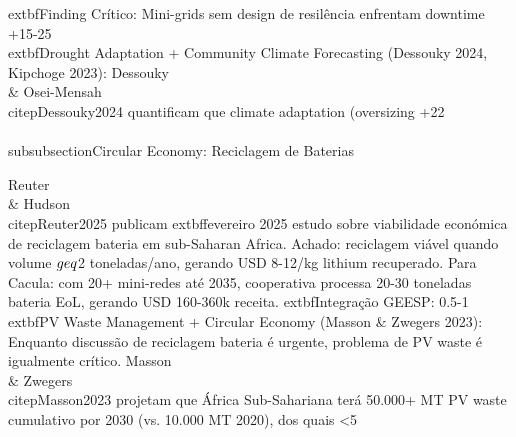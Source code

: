 \documentclass[12pt, a4paper]{article}
\begin{document}
{{{{{{{{{{{	extbf{Finding Crítico}: Mini-grids sem design de resilência enfrentam downtime +15-25\\%

	extbf{Drought Adaptation + Community Climate Forecasting (Dessouky 2024, Kipchoge 2023)}: Dessouky \\& Osei-Mensah~\\citep{Dessouky2024} quantificam que climate adaptation (oversizing +22\\%

\\subsubsection{Circular Economy: Reciclagem de Baterias}

Reuter \\& Hudson~\\citep{Reuter2025} publicam 	extbf{fevereiro 2025} estudo sobre viabilidade económica de reciclagem bateria em sub-Saharan Africa. Achado: reciclagem viável quando volume $\\geq$2 toneladas/ano, gerando USD 8-12/kg lithium recuperado. Para Cacula: com 20+ mini-redes até 2035, cooperativa processa 20-30 toneladas bateria EoL, gerando USD 160-360k receita. 	extbf{Integração GEESP}: 0.5-1\\%

	extbf{PV Waste Management + Circular Economy (Masson & Zwegers 2023)}: Enquanto discussão de reciclagem bateria é urgente, problema de PV waste é igualmente crítico. Masson \\& Zwegers~\\citep{Masson2023} projetam que África Sub-Sahariana terá 50.000+ MT PV waste cumulativo por 2030 (vs. 10.000 MT 2020), dos quais <5\\%

}}}}}}}}}}}
\end{document}
